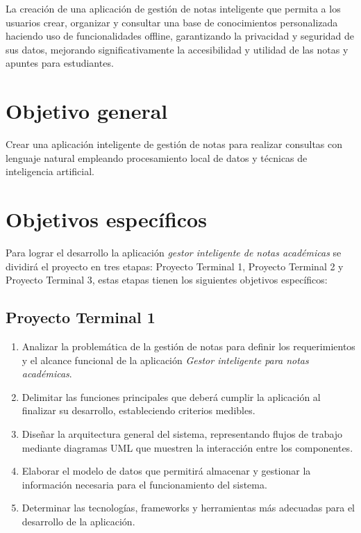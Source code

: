 \noindent La creación de una aplicación de gestión de notas inteligente que permita a los usuarios crear, organizar y consultar una base de conocimientos personalizada haciendo uso de funcionalidades offline, garantizando la privacidad y seguridad de sus datos, mejorando significativamente la accesibilidad y utilidad de las notas y apuntes para estudiantes.

\section{Objetivo general}

Crear una aplicación inteligente de gestión de notas para realizar consultas con lenguaje natural empleando procesamiento local de datos y técnicas de inteligencia artificial.

\section{Objetivos específicos}
\label{sec:objetivos_especificos}

Para lograr el desarrollo la aplicación \emph{gestor inteligente de notas académicas} se dividirá el proyecto en tres etapas: Proyecto Terminal 1, Proyecto Terminal 2 y Proyecto Terminal 3, estas etapas tienen los siguientes objetivos específicos:

\subsection*{Proyecto Terminal 1}

\begin{enumerate}
\item Analizar la problemática de la gestión de notas para definir los requerimientos y el alcance funcional de la aplicación \emph{Gestor inteligente para notas académicas}.

\item Delimitar las funciones principales que deberá cumplir la aplicación al finalizar su desarrollo, estableciendo criterios medibles.

\item Diseñar la arquitectura general del sistema, representando flujos de trabajo mediante diagramas UML que muestren la interacción entre los componentes.

\item Elaborar el modelo de datos que permitirá almacenar y gestionar la información necesaria para el funcionamiento del sistema.

\item Determinar las tecnologías, frameworks y herramientas más adecuadas para el desarrollo de la aplicación.
\end{enumerate}

